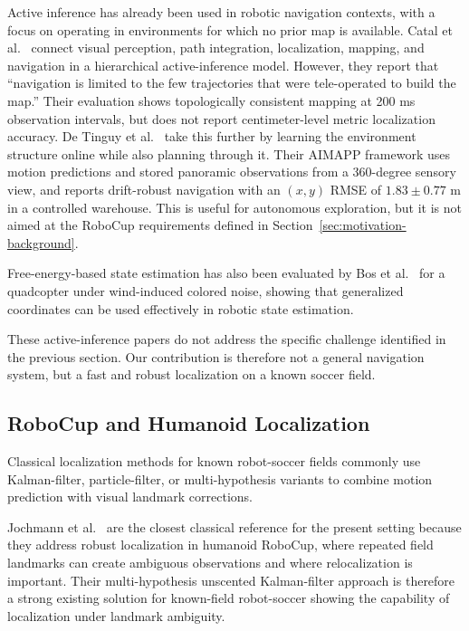 Active inference has already been used in robotic navigation contexts, with a focus on operating in environments for which no prior map is available. 
Catal et al.~\cite{catal_robot_2021} connect visual perception, path integration, localization, mapping, and navigation in a hierarchical active-inference model. However, they report that ``navigation is limited to the few trajectories that were tele-operated to build the map.'' Their evaluation shows topologically consistent mapping at 200 ms observation intervals, but does not report centimeter-level metric localization accuracy. 
De Tinguy et al.~\cite{de_tinguy_online_2025} take this further by learning the environment structure online while also planning through it. Their AIMAPP framework uses motion predictions and stored panoramic observations from a 360-degree sensory view, and reports drift-robust navigation with an $(x,y)$ RMSE of $1.83 \pm 0.77$ m in a controlled warehouse. This is useful for autonomous exploration, but it is not aimed at the RoboCup requirements defined in Section~\ref{sec:motivation-background}.

Free-energy-based state estimation has also been evaluated by Bos et al.~\cite{bos_free_2021} for a quadcopter under wind-induced colored noise, showing that generalized coordinates can be used effectively in robotic state estimation. 

These active-inference papers do not address the specific challenge identified in the previous section. Our contribution is therefore not a
general navigation system, but a fast and robust localization on a known soccer field.


\subsection{RoboCup and Humanoid Localization}
\label{subsec:related-robocup}

Classical localization methods for known robot-soccer fields commonly use Kalman-filter, particle-filter, or multi-hypothesis variants to combine motion prediction with visual landmark corrections.

Jochmann et al.~\cite{jochmann_efficient_2012} are the closest classical reference for the present setting because they address robust localization in humanoid RoboCup, where repeated field landmarks can create ambiguous observations and where relocalization is important. Their multi-hypothesis unscented Kalman-filter approach is therefore a strong existing solution for known-field robot-soccer showing the capability of localization under landmark ambiguity.

